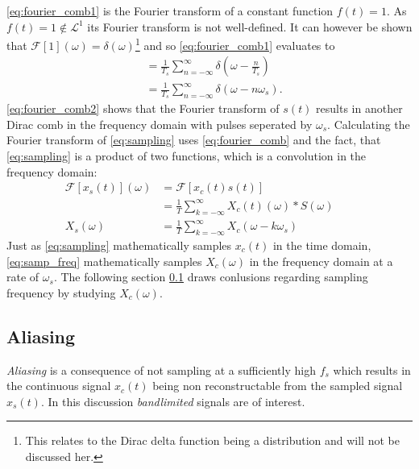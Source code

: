 \eqref{eq:fourier_comb1} is the Fourier transform of a constant function $f(t)=1$. As $f(t)=1\notin\mathcal{L}^1$ its Fourier transform is not well-defined. It can however be shown that $\mathcal{F}[1](\omega)=\delta(\omega)$\footnote{This relates to the Dirac delta function being a distribution and will not be discussed her.} and so \eqref{eq:fourier_comb1} evaluates to
\begin{align}
&=\frac{1}{T_s}\sum_{n=-\infty}^{\infty}\delta(\omega-\frac{n}{T_s})\nonumber\\
&=\frac{1}{T_s}\sum_{n=-\infty}^{\infty}\delta(\omega-n\omega_s).\label{eq:fourier_comb2}
\end{align}
\eqref{eq:fourier_comb2} shows that the Fourier transform of $s(t)$ results in another Dirac comb in the frequency domain with pulses seperated by $\omega_s$.
Calculating the Fourier transform of \eqref{eq:sampling} uses \eqref{eq:fourier_comb} and the fact, that \eqref{eq:sampling} is a product of two functions, which is a convolution in the frequency domain:
\begin{align}
\mathcal{F}[x_s(t)](\omega)&=\mathcal{F}[x_c(t)s(t)]\nonumber\\
&=\frac{1}{T}\sum_{k=-\infty}^{\infty}X_c(t)(\omega)*S(\omega)\phantom{mm}\nonumber\\
X_s(\omega)&=\frac{1}{T}\sum_{k=-\infty}^{\infty}X_c(\omega-k\omega_s)\label{eq:samp_freq}
\end{align}
Just as \eqref{eq:sampling} mathematically samples $x_c(t)$ in the time domain, \eqref{eq:samp_freq} mathematically samples $X_c(\omega)$ in the frequency domain at a rate of $\omega_s$. The following section \ref{sec:aliasing} draws conlusions regarding sampling frequency by studying $X_c(\omega)$.
\subsection{Aliasing}\label{sec:aliasing}
\textit{Aliasing} is a consequence of not sampling  at a sufficiently high $f_s$ which results in the continuous signal $x_c(t)$ being non reconstructable from the sampled signal $x_s(t)$. In this discussion \textit{bandlimited} signals are of interest.
